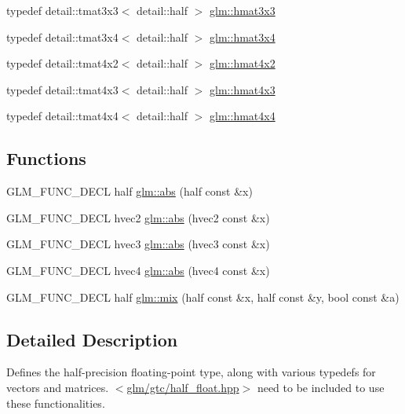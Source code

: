 \begin{DoxyCompactItemize}
\item 
typedef detail\+::tmat3x3$<$ detail\+::half $>$ \hyperlink{group__gtc__half__float_ga074b3f26b6be3af8ac817a2c4eba8434}{glm\+::hmat3x3}
\item 
typedef detail\+::tmat3x4$<$ detail\+::half $>$ \hyperlink{group__gtc__half__float_gabde8c0dd3585490525f0d2b2da25e24a}{glm\+::hmat3x4}
\item 
typedef detail\+::tmat4x2$<$ detail\+::half $>$ \hyperlink{group__gtc__half__float_gadaf0a1837917e1b87a5269b379f90e33}{glm\+::hmat4x2}
\item 
typedef detail\+::tmat4x3$<$ detail\+::half $>$ \hyperlink{group__gtc__half__float_ga44cb3a8fb375a76fc6ccb2f0add2bcf2}{glm\+::hmat4x3}
\item 
typedef detail\+::tmat4x4$<$ detail\+::half $>$ \hyperlink{group__gtc__half__float_gabf1d2a56f968368a22222ab03fedf67f}{glm\+::hmat4x4}
\end{DoxyCompactItemize}
\subsection*{Functions}
\begin{DoxyCompactItemize}
\item 
G\+L\+M\+\_\+\+F\+U\+N\+C\+\_\+\+D\+E\+C\+L half \hyperlink{group__gtc__half__float_ga7baeb4a0d33ef51c77ef5b69fe5a18d3}{glm\+::abs} (half const \&x)
\item 
G\+L\+M\+\_\+\+F\+U\+N\+C\+\_\+\+D\+E\+C\+L hvec2 \hyperlink{group__gtc__half__float_ga45cfe493b84a3defa8ee522dba1db7ad}{glm\+::abs} (hvec2 const \&x)
\item 
G\+L\+M\+\_\+\+F\+U\+N\+C\+\_\+\+D\+E\+C\+L hvec3 \hyperlink{group__gtc__half__float_ga239a9e24147a79fb9e7ae39454258966}{glm\+::abs} (hvec3 const \&x)
\item 
G\+L\+M\+\_\+\+F\+U\+N\+C\+\_\+\+D\+E\+C\+L hvec4 \hyperlink{group__gtc__half__float_ga8b3b9d614c70a6b70eabb7c908f90cd6}{glm\+::abs} (hvec4 const \&x)
\item 
G\+L\+M\+\_\+\+F\+U\+N\+C\+\_\+\+D\+E\+C\+L half \hyperlink{group__gtc__half__float_gad404634256be379c3e205f75d096c43c}{glm\+::mix} (half const \&x, half const \&y, bool const \&a)
\end{DoxyCompactItemize}


\subsection{Detailed Description}
Defines the half-\/precision floating-\/point type, along with various typedefs for vectors and matrices. $<$\hyperlink{half__float_8hpp}{glm/gtc/half\+\_\+float.\+hpp}$>$ need to be included to use these functionalities. 

